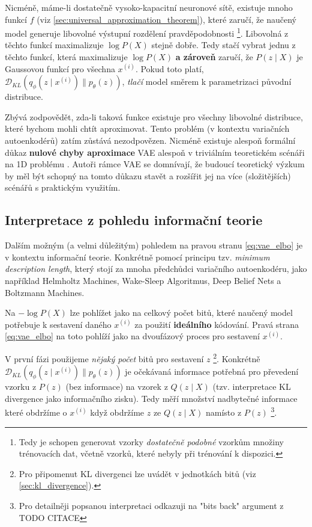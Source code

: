 Nicméně, máme-li dostatečně vysoko-kapacitní neuronové sítě, existuje mnoho funkcí $f$ (viz \autoref{sec:universal_approximation_theorem}), které zaručí, že naučený model generuje libovolné výstupní rozdělení pravděpodobnosti
\footnote{Tedy je schopen generovat vzorky \emph{dostatečně podobné} vzorkům množiny trénovacích dat, včetně vzorků, které nebyly při trénování k dispozici.}.
Libovolná z těchto funkcí maximalizuje $\log P(X)$ stejně dobře. Tedy stačí vybrat jednu z těchto funkcí, která maximalizuje $\log P(X)$ \textbf{a zároveň} zaručí, že $P (z\mid X)$ je Gaussovou funkcí pro všechna $x^{(i)}$.
Pokud toto platí, $\mathcal{D}_{KL}(q_\phi(z\mid x^{(i)})\parallel p_\theta(z))$, \emph{tlačí} model směrem k parametrizaci původní distribuce.

Zbývá zodpovědět, zda-li taková funkce existuje pro všechny libovolné distribuce, které bychom mohli chtít aproximovat.
Tento problém (v kontextu variačních autoenkodérů) zatím zůstává nezodpovězen. Nicméně existuje alespoň formální důkaz \textbf{nulové chyby aproximace} VAE alespoň v triviálním teoretickém scénáři na 1D problému \cite[Příloha A]{Doersch2021}.
Autoři rámce VAE se domnívají, že budoucí teoretický výzkum by měl být schopný na tomto důkazu stavět a rozšířit jej na více (složitějších) scénářů s praktickým využitím. 

\subsection{Interpretace z pohledu informační teorie}
\label{sec:vae_information_theory_interpretation}
Dalším možným (a velmi důležitým) pohledem na pravou stranu \autoref{eq:vae_elbo} je v kontextu informační teorie.
Konkrétně pomocí principu tzv. \emph{minimum description length}, který stojí za mnoha předchůdci variačního autoenkodéru, jako například Helmholtz Machines, Wake-Sleep Algoritmus, Deep Belief Nets a Boltzmann Machines.

Na $- \log P(X)$ lze pohlížet jako na celkový počet bitů, které naučený model potřebuje k sestavení daného $x^{(i)}$ za použití \textbf{ideálního} kódování.
Pravá strana \autoref{eq:vae_elbo} na toto pohlíží jako na dvoufázový proces pro sestavení $x^{(i)}$.

V první fázi použijeme \emph{nějaký počet} bitů pro sestavení $z$ \footnote{Pro připomenut KL divergenci lze uvádět v jednotkách bitů (viz \autoref{sec:kl_divergence}).}.
Konkrétně $\mathcal{D}_{KL}(q_\phi(z\mid x^{(i)})\parallel p_\theta(z))$ je očekávaná informace potřebná pro převedení vzorku z $P(z)$ (bez informace) na vzorek z $Q(z\mid X)$ (tzv. interpretace KL divergence jako informačního zisku).
Tedy měří množství nadbytečné informace které obdržíme o $x^{(i)}$ když obdržíme $z$ ze $Q(z\mid X)$ namísto z $P(z)$
\footnote{Pro detailněji popsanou interpretaci odkazuji na "bits back" argument z TODO CITACE }.

